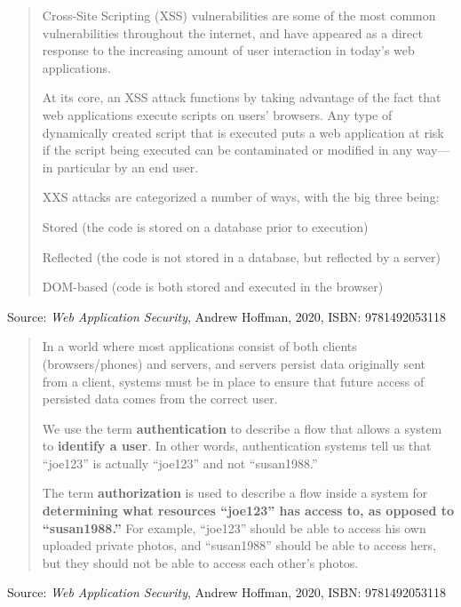 \documentclass[Screen16to9,17pt]{foils}
\begin{document}


\begin{quote}
Cross-Site Scripting (XSS) vulnerabilities are some of the most common vulnerabilities throughout the internet, and have appeared as a direct response to the increasing amount of user interaction in today’s web applications.

At its core, an XSS attack functions by taking advantage of the fact that web applications execute scripts on users’ browsers. Any type of dynamically created script that is executed puts a web application at risk if the script being executed can be contaminated or modified in any way—in particular by an end user.

XXS attacks are categorized a number of ways, with the big three being:
\begin{list2}
\item Stored (the code is stored on a database prior to execution)
\item Reflected (the code is not stored in a database, but reflected by a server)
\item DOM-based (code is both stored and executed in the browser)
\end{list2}
\end{quote}

Source: \emph{Web Application Security}, Andrew Hoffman, 2020, ISBN: 9781492053118




\begin{quote}
In a world where most applications consist of both clients (browsers/phones) and servers, and servers persist data originally sent from a client, systems must be in place to ensure that future access of persisted data comes from the correct user.

We use the term {\bf authentication} to describe a flow that allows a system to {\bf identify a user}. In other words, authentication systems tell us that “joe123” is actually “joe123” and not “susan1988.”

The term {\bf authorization} is used to describe a flow inside a system for {\bf determining what resources “joe123” has access to, as opposed to “susan1988.”} For example, “joe123” should be able to access his own uploaded private photos, and “susan1988” should be able to access hers, but they should not be able to access each other’s photos.
\end{quote}
Source: \emph{Web Application Security}, Andrew Hoffman, 2020, ISBN: 9781492053118
\end{document}
